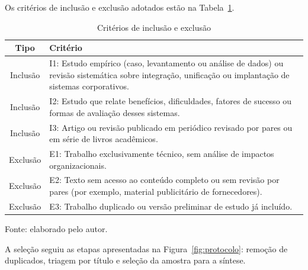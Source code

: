 Os critérios de inclusão e exclusão adotados estão na Tabela~\ref{tab:criterios}.


\begin{table}[H]
\centering
\caption{Critérios de inclusão e exclusão}
\label{tab:criterios}
\begin{tabularx}{\textwidth}{cX}
\toprule
\textbf{Tipo} & \textbf{Critério} \\ \midrule
Inclusão & I1: Estudo empírico (caso, levantamento ou análise de dados) ou revisão sistemática sobre integração, unificação ou implantação de sistemas corporativos. \\ \midrule
Inclusão & I2: Estudo que relate benefícios, dificuldades, fatores de sucesso ou formas de avaliação desses sistemas. \\ \midrule
Inclusão & I3: Artigo ou revisão publicado em periódico revisado por pares ou em série de livros acadêmicos. \\ \midrule
Exclusão & E1: Trabalho exclusivamente técnico, sem análise de impactos organizacionais. \\ \midrule
Exclusão & E2: Texto sem acesso ao conteúdo completo ou sem revisão por pares (por exemplo, material publicitário de fornecedores). \\ \midrule
Exclusão & E3: Trabalho duplicado ou versão preliminar de estudo já incluído. \\ \bottomrule
\end{tabularx}

\vspace{0.2cm}
{\footnotesize Fonte: elaborado pelo autor.}
\end{table}

A seleção seguiu as etapas apresentadas na Figura~\ref{fig:protocolo}: remoção de duplicados, triagem por título e seleção da amostra para a síntese.

